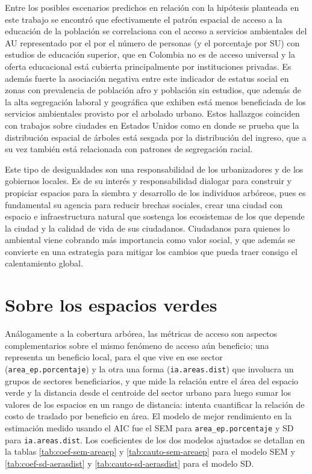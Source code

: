 \documentclass[12pt,]{book}
\begin{document}
Entre los posibles escenarios predichos en relación con la hipótesis
planteada en este trabajo se encontró que efectivamente el patrón
espacial de acceso a la educación de la población se correlaciona con el
acceso a servicios ambientales del AU representado por el por el número
de personas (y el porcentaje por SU) con estudios de educación superior,
que en Colombia no es de acceso universal y la oferta educacional está
cubierta principalmente por instituciones privadas. Es además fuerte la
asociación negativa entre este indicador de estatus social en zonas con
prevalencia de población afro y población sin estudios, que además de la
alta segregación laboral y geográfica que exhiben
\citep{arroyo_mina_afrocolombianos_2016, mora_brechas_2014, ceron_indice_2014, PACHECO2013121}
está menos beneficiada de los servicios ambientales provisto por el
arbolado urbano. Estos hallazgos coinciden con trabajos sobre ciudades
en Estados Unidos como en \citep{schwarz_trees_2015} donde se prueba que
la distribución espacial de árboles está sesgada por la distribución del
ingreso, que a su vez también está relacionada con patrones de
segregación racial.

Este tipo de desigualdades son una responsabilidad de los urbanizadores
y de los gobiernos locales. Es de su interés y responsabilidad dialogar
para construir y propiciar espacios para la siembra y desarrollo de los
individuos arbóreos, pues es fundamental su agencia para reducir brechas
sociales, crear una ciudad con espacio e infraestructura natural que
sostenga los ecosistemas de los que depende la ciudad y la calidad de
vida de sus ciudadanos. Ciudadanos para quienes lo ambiental viene
cobrando más importancia como valor social, y que además se convierte en
una estrategia para mitigar los cambios que pueda traer consigo el
calentamiento global.

\section{Sobre los espacios verdes}\label{sobre-los-espacios-verdes}

Análogamente a la cobertura arbórea, las métricas de acceso son aspectos
complementarios sobre el mismo fenómeno de acceso aún beneficio; una
representa un beneficio local, para el que vive en ese sector
(\texttt{area\_ep.porcentaje}) y la otra una forma
(\texttt{ia.areas.dist}) que involucra un grupos de sectores
beneficiarios, y que mide la relación entre el área del espacio verde y
la distancia desde el centroide del sector urbano para luego sumar los
valores de los espacios en un rango de distancia: intenta cuantificar la
relación de costo de traslado por beneficio en área. El modelo de mejor
rendimiento en la estimación medido usando el AIC fue el SEM para
\texttt{area\_ep.porcentaje} y SD para \texttt{ia.areas.dist}. Los
coeficientes de los dos modelos ajustados se detallan en la tablas
\ref{tab:coef-sem-areaep} y \ref{tab:cauto-sem-areaep} para el modelo
SEM y \ref{tab:coef-sd-aerasdist} y \ref{tab:cauto-sd-aerasdist} para el
modelo SD.
\end{document}
